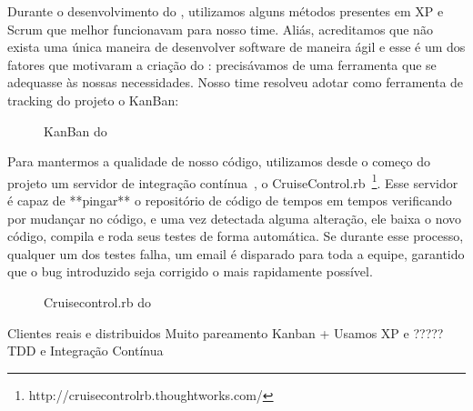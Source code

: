 Durante o desenvolvimento do \calopsita, utilizamos alguns métodos presentes em XP e Scrum que melhor funcionavam para nosso time. Aliás, acreditamos que não exista uma única maneira de desenvolver software de maneira ágil e esse é um dos fatores que motivaram a criação do \calopsita: precisávamos de uma ferramenta que se adequasse às nossas necessidades. Nosso time resolveu adotar como ferramenta de tracking do projeto o KanBan:

\begin{figure}[H]
  \centering
  \caption{KanBan do \calopsita}
\end{figure}

Para mantermos a qualidade de nosso código, utilizamos desde o começo do projeto um servidor de integração contínua~\cite{ci}, o CruiseControl.rb~\footnote{http://cruisecontrolrb.thoughtworks.com/}. Esse servidor é capaz de **pingar** o repositório de código de tempos em tempos verificando por mudançar no código, e uma vez detectada alguma alteração, ele baixa o novo código, compila e roda seus testes de forma automática. Se durante esse processo, qualquer um dos testes falha, um email é disparado para toda a equipe, garantido que o bug introduzido seja corrigido o mais rapidamente possível.

\begin{figure}[H]
  \centering
  \caption{Cruisecontrol.rb do \calopsita}
\end{figure}

Clientes reais e distribuidos
Muito pareamento
Kanban + \calopsita
Usamos XP e ?????
TDD e Integração Contínua

